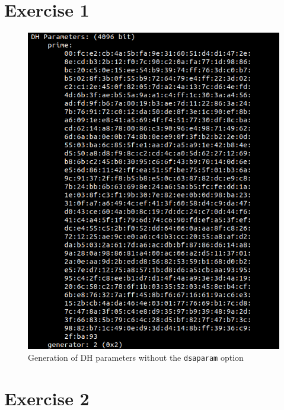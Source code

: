 \documentclass[a4paper]{article}
\begin{document}
\pagebreak

\begin{appendices}

\section*{Exercise 1}

\begin{figure}[H]
    \centering
    \includegraphics[width=.9\textwidth]{img/dhparam.png}
    \caption{Generation of DH parameters without the \texttt{dsaparam} option}
    \label{fig:dhparam}
\end{figure}

\section*{Exercise 2}


\end{appendices}
\end{document}
